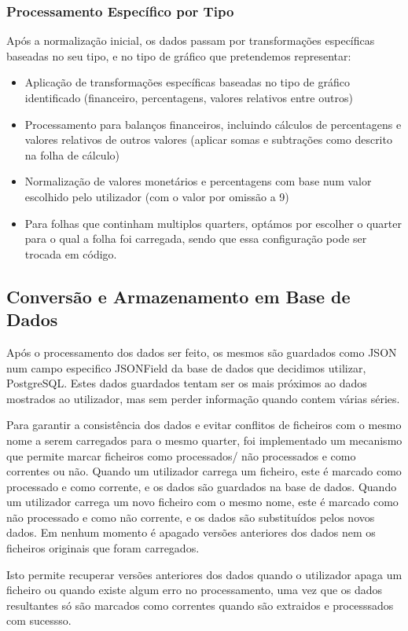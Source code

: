 \subsubsection{Processamento Específico por Tipo}
Após a normalização inicial, os dados passam por transformações específicas baseadas no seu tipo, e no tipo de gráfico que pretendemos representar:
\begin{itemize}
    \item Aplicação de transformações específicas baseadas no tipo de gráfico identificado (financeiro, percentagens, valores relativos entre outros)
    \item Processamento para balanços financeiros, incluindo cálculos de percentagens e valores relativos de outros valores (aplicar somas e subtrações como descrito na folha de cálculo)
    \item Normalização de valores monetários e percentagens com base num valor escolhido pelo utilizador (com o valor por omissão a 9)
    \item Para folhas que continham multiplos quarters, optámos por escolher o quarter para o qual a folha foi carregada, sendo que essa configuração pode ser trocada em código.
\end{itemize}

\subsection{Conversão e Armazenamento em Base de Dados}
Após o processamento dos dados ser feito, os mesmos são guardados como JSON num campo especifico JSONField da base de dados que decidimos utilizar, PostgreSQL. Estes dados guardados tentam ser os mais próximos ao dados mostrados ao utilizador, mas sem perder informação quando contem várias séries.

Para garantir a consistência dos dados e evitar conflitos de ficheiros com o mesmo nome a serem carregados para o mesmo quarter, foi implementado um mecanismo que permite marcar ficheiros como processados/ não processados e como correntes ou não. Quando um utilizador carrega um ficheiro, este é marcado como processado e como corrente, e os dados são guardados na base de dados. Quando um utilizador carrega um novo ficheiro com o mesmo nome, este é marcado como não processado e como não corrente, e os dados são substituídos pelos novos dados. Em nenhum momento é apagado versões anteriores dos dados nem os ficheiros originais que foram carregados.

Isto permite recuperar versões anteriores dos dados quando o utilizador apaga um ficheiro ou quando existe algum erro no processamento, uma vez que os dados resultantes só são marcados como correntes quando são extraidos e processsados com sucessso.

